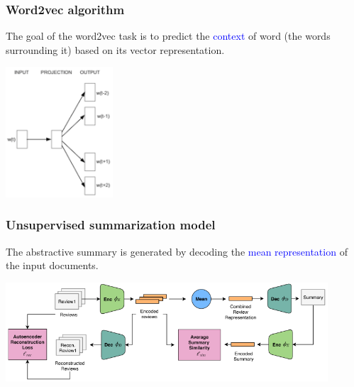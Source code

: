 \documentclass[9pt]{beamer}
\begin{document}
\begin{frame}
  \frametitle{Word2vec algorithm}

  The goal of the word2vec task is to predict the
  \textcolor{blue}{context} of word (the words surrounding it) based
  on its vector representation.

  \begin{center}
    \includegraphics[width = 4cm]{images/w2v.png}
  \end{center}
\end{frame}

\begin{frame}
  \frametitle{Unsupervised summarization model}

  The abstractive summary is generated by decoding the
  \textcolor{blue}{mean representation} of the input documents.

  \begin{center}
    \includegraphics[width = 12cm]{images/unsupervised_summarization_model.png}
  \end{center}
\end{frame}
\end{document}

